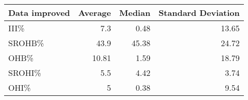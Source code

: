\begin{tabular}{lrrrrrrrr}
\end{tabular}\begin{tabular}{lrrr}
\hline
 Data improved   &   Average &   Median &   Standard Deviation \\
\hline
 III\%            &      7.3  &     0.48 &                13.65 \\
 SROHB\%          &     43.9  &    45.38 &                24.72 \\
 OHB\%            &     10.81 &     1.59 &                18.79 \\
 SROHI\%          &      5.5  &     4.42 &                 3.74 \\
 OHI\%            &      5    &     0.38 &                 9.54 \\
\hline
\end{tabular}

